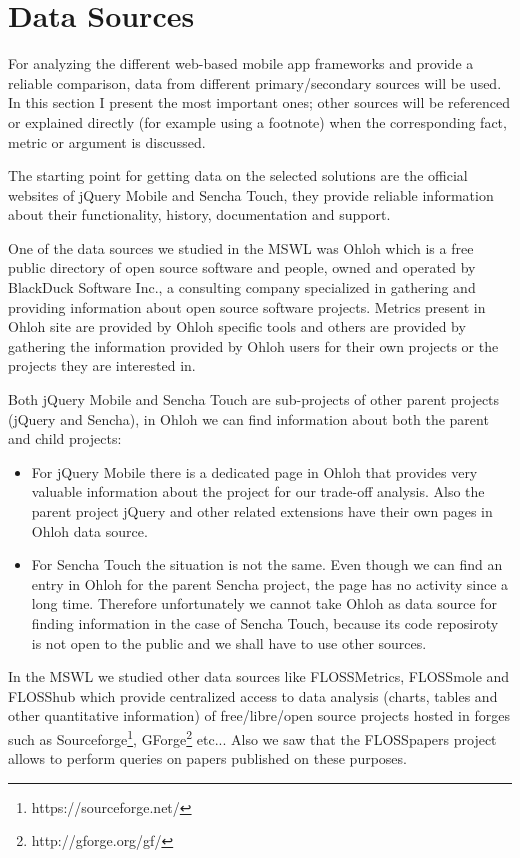 \documentclass[a4paper,12pt]{book}
\begin{document}
\section{Data Sources}
\label{sec:data}

For analyzing the different web-based mobile app frameworks and provide a reliable comparison, data from different primary/secondary sources will be used. In this section I present the most important ones; other sources will be referenced or explained directly (for example using a footnote) when the corresponding fact, metric or argument is discussed.

The starting point for getting data on the selected solutions are the official websites of jQuery Mobile\cite{jquery} and Sencha Touch\cite{sencha}, they provide reliable information about their functionality, history, documentation and support. 

One of the data sources we studied in the MSWL was Ohloh\cite{Ohloh} which is a free public
directory of open source software and people, owned and operated by BlackDuck Software Inc., a consulting company specialized in gathering and providing information about open source software projects. Metrics present in Ohloh site are provided by Ohloh specific tools and others are provided by gathering the information provided by Ohloh users for their own projects or the projects they are interested in.

Both jQuery Mobile and Sencha Touch are sub-projects of other parent projects (jQuery and Sencha), in Ohloh we can find information about both the parent and child projects:

\begin{itemize}
 \item For jQuery Mobile there is a dedicated page in Ohloh\cite{ojquery} that provides very valuable information about the project for our trade-off analysis. Also the parent project jQuery\cite{ojqueryparent} and other related extensions have their own pages in Ohloh data source.
 \item For Sencha Touch the situation is not the same. Even though we can find an entry in Ohloh for the parent Sencha project\cite{osencha}, the page has no activity since a long time. Therefore unfortunately we cannot take Ohloh as data source for finding information in the case of Sencha Touch, because its code reposiroty is not open to the public and we shall have to use other sources.
\end{itemize}

In the MSWL we studied other data sources like FLOSSMetrics\cite{FLOSSMetrics}, FLOSSmole\cite{FLOSSmole} and FLOSShub\cite{FLOSShub} which provide centralized access to data analysis (charts, tables and other quantitative information) of free/libre/open source projects hosted in forges such as Sourceforge\footnote{https://sourceforge.net/}, GForge\footnote{http://gforge.org/gf/} etc... Also we saw that the FLOSSpapers project\cite{FLOSSpapers} allows to perform queries on papers published on these purposes.
\end{document}

